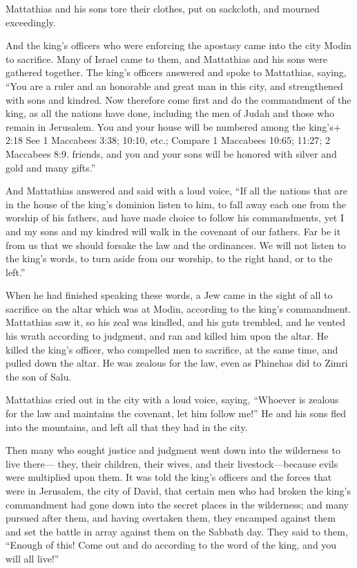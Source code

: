  Mattathias and his sons tore their clothes, put on
sackcloth, and mourned exceedingly.

 And the king's officers who were enforcing the apostasy
came into the city Modin to sacrifice.  Many of Israel came
to them, and Mattathias and his sons were gathered together.
 The king's officers answered and spoke to Mattathias,
saying, ``You are a ruler and an honorable and great man in this city,
and strengthened with sons and kindred.  Now therefore come
first and do the commandment of the king, as all the nations have done,
including the men of Judah and those who remain in Jerusalem. You and
your house will be numbered among the king's+ 2:18 See 1 Maccabees 3:38;
10:10, etc.; Compare 1 Maccabees 10:65; 11:27; 2 Maccabees 8:9. friends,
and you and your sons will be honored with silver and gold and many
gifts.''

 And Mattathias answered and said with a loud voice, ``If
all the nations that are in the house of the king's dominion listen to
him, to fall away each one from the worship of his fathers, and have
made choice to follow his commandments,  yet I and my sons
and my kindred will walk in the covenant of our fathers. 
Far be it from us that we should forsake the law and the ordinances.
 We will not listen to the king's words, to turn aside from
our worship, to the right hand, or to the left.''

 When he had finished speaking these words, a Jew came in
the sight of all to sacrifice on the altar which was at Modin, according
to the king's commandment.  Mattathias saw it, so his zeal
was kindled, and his guts trembled, and he vented his wrath according to
judgment, and ran and killed him upon the altar.  He killed
the king's officer, who compelled men to sacrifice, at the same time,
and pulled down the altar.  He was zealous for the law,
even as Phinehas did to Zimri the son of Salu.

 Mattathias cried out in the city with a loud voice,
saying, ``Whoever is zealous for the law and maintains the covenant, let
him follow me!''  He and his sons fled into the mountains,
and left all that they had in the city.

 Then many who sought justice and judgment went down into
the wilderness to live there---  they, their children,
their wives, and their livestock---because evils were multiplied upon
them.  It was told the king's officers and the forces that
were in Jerusalem, the city of David, that certain men who had broken
the king's commandment had gone down into the secret places in the
wilderness;  and many pursued after them, and having
overtaken them, they encamped against them and set the battle in array
against them on the Sabbath day.  They said to them,
``Enough of this! Come out and do according to the word of the king, and
you will all live!''

